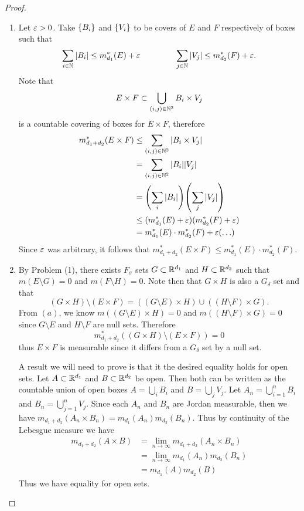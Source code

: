 \documentclass[hw_all.tex]{subfiles}
\begin{document}
\begin{proof}
    \begin{enumerate}
        \item
            Let $\varepsilon > 0$. Take $\qty{B_i}$ and $\qty{V_i}$ to be covers of $E$ and $F$ respectively of boxes such that
            \[
                \sum_{i \in \mathbb{N}} |B_i| \leq m_{d_1}^*(E) + \varepsilon \hspace{1.5cm} \sum_{j \in \mathbb{N}} |V_j| \leq m_{d_2}^*(F) + \varepsilon
            .\]
            Note that
            \[
                E \times F \subset \bigcup_{(i,j) \in \mathbb{N}^2} B_i \times V_j
            \]
            is a countable covering of boxes for $E \times F$, therefore
            \begin{align*}
                m_{d_1 + d_2}^*(E \times F) &\leq \sum_{(i,j) \in \mathbb{N}^2} |B_i \times V_j| \\
                &= \sum_{(i,j) \in \mathbb{N}^2} |B_i| |V_j| \\
                &= \qty(\sum_{i} |B_i|) \qty(\sum_{j} |V_j|) \\
                &\leq (m_{d_1}^*(E) + \varepsilon) (m_{d_2}^*(F) + \varepsilon) \\
                &= m_{d_1}^*(E) \cdot m_{d_2}^*(F) + \varepsilon (\ldots)
            \end{align*}
            Since $\varepsilon$ was arbitrary, it follows that $m_{d_1 + d_2}^*(E \times F) \leq m_{d_1}^*(E) \cdot m_{d_2}^*(F)$.

        \item
            By Problem (1), there exists $F_{\sigma}$ sets $G \subset \mathbb{R}^{d_1}$ and $H \subset \mathbb{R}^{d_2}$ such that $m(E \setminus G) = 0$ and $m(F \setminus H) = 0$. Note then that $G \times H$ is also a $G_{\delta}$ set and that
            \[
                (G \times H) \setminus (E \times F) = ((G \setminus E) \times H) \cup ((H \setminus F) \times G)
            .\]
            From $(a)$, we know $m((G \setminus E) \times H) = 0$ and $m((H \setminus F) \times G) = 0$ since $G \setminus E$ and $H \setminus F$ are null sets. Therefore
            \[
                m^*_{d_1 + d_2}((G \times H) \setminus (E \times F)) = 0
            \]
            thus $E \times F$ is measurable since it differs from a $G_{\delta}$ set by a null set.

            A result we will need to prove is that it the desired equality holds for open sets. Let $A \subset \mathbb{R}^{{d_1}}$ and $B \subset \mathbb{R}^{d_2}$ be open. Then both can be written as the countable union of open boxes $A = \bigcup_i B_i$ and $B = \bigcup_j V_j$. Let $A_n = \bigcup_{i = 1}^n B_i$ and $B_n = \bigcup_{j=1}^n V_j$. Since each $A_n$ and $B_n$ are Jordan measurable, then we have $m_{d_1 + d_2}(A_n \times B_n) = m_{d_1}(A_n) m_{d_2}(B_n)$. Thus by continuity of the Lebesgue measure we have
            \begin{align*}
                m_{d_1 + d_2}(A \times B) &= \lim_{n \to \infty} m_{d_1 + d_2}(A_n \times B_n) \\
                &= \lim_{n \to \infty} m_{d_1}(A_n) m_{d_2}(B_n) \\
                &= m_{d_1}(A) m_{d_2}(B)
            \end{align*}
            Thus we have equality for open sets.


\end{enumerate}
\end{proof}
\end{document}
